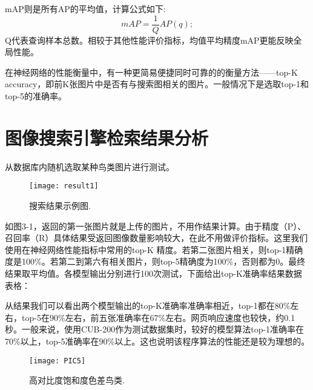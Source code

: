 \documentclass[bachelor_p]{hdu-thesis}
\begin{document}
mAP则是所有AP的平均值，计算公式如下:
\begin{equation}
  mAP = \frac{1}{Q}AP(q);
\end{equation}
Q代表查询样本总数。相较于其他性能评价指标，均值平均精度mAP更能反映全局性能。

在神经网络的性能衡量中，有一种更简易便捷同时可靠的的衡量方法——top-K accuracy，即前K张图片中是否有与搜索图相关的图片。一般情况下是选取top-1和top-5的准确率。

\section{图像搜索引擎检索结果分析}

从数据库内随机选取某种鸟类图片进行测试。
\begin{figure}[!htb]
  \centering
  \texttt{[image: result1]}
  \caption{搜索结果示例图.}
  \label{fig_result1}
\end{figure}

如图3-1，返回的第一张图片就是上传的图片，不用作结果计算。由于精度（P）、召回率（R）具体结果受返回图像数量影响较大，在此不用做评价指标。这里我们使用在神经网络性能指标中常用的top-K 精度。若第二张图片相关，则top-1精确度是100$\%$。若第二到第六有相关图片，则top-5精确度为100$\%$，否则都为0。最终结果取平均值。各模型输出分别进行100次测试，下面给出top-K准确率结果数据表格：

\begin{table}[h]
  \caption{检索结果表格}
\centering
{}
\label{gra_process}
\end{table}

从结果我们可以看出两个模型输出的top-K准确率准确率相近，top-1都在80$\%$左右，top-5在90$\%$左右，前五张准确率在67$\%$左右。网页响应速度也较快，约0.1秒。一般来说，使用CUB-200作为测试数据集时，较好的模型算法top-1准确率在70$\%$以上，top-5准确率在90$\%$以上。这也说明该程序算法的性能还是较为理想的。

\begin{figure}[!htb]
  \centering
  \texttt{[image: PIC5]}
  \caption{高对比度饱和度色差鸟类.}
  \label{fig_PIC5}
\end{figure}
\end{document}
